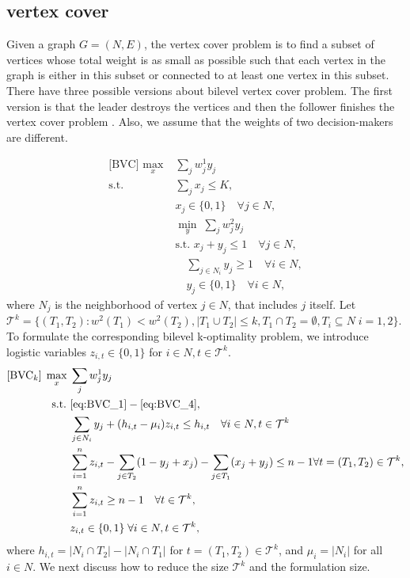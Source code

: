 \documentclass[11pt]{article}
\newcommand{\T}{\mathcal{T}}
\begin{document}
\subsection{vertex cover}
Given a graph $G = (N, E)$, the vertex cover problem is to find a subset of vertices whose total weight is as small as possible such that each vertex in the graph is either in this subset or connected to at least one vertex in this subset. There have three possible versions about bilevel vertex cover problem. The first version is that the leader destroys the vertices and then the follower finishes the vertex cover problem \cite{bazgan2011most}. Also, we assume that the weights of two decision-makers are different.

\begin{subequations}
	\begin{align}
	\text{[BVC]~}\max_x\; & \sum_j w_j^1 y_j \nonumber\\
	\text{s.t.~} & \sum_{j} x_j \leq K, \label{eq:BVC_1} \\
	& x_j \in \{0,1\} \quad \forall j\in N, \\
	& \min_y\;  \sum_j w_j^2 y_j \nonumber\\
	&\text{s.t.~}  x_j + y_j \leq 1 \quad \forall j\in N, \\
	& \quad \sum_{j\in N_i} y_j \geq 1 \quad \forall i\in N, \label{eq:BVC_3}\\
	& \quad y_j \in \{0, 1\} \quad \forall i \in N, \label{eq:BVC_4}
	\end{align}
\end{subequations}
where $N_j$ is the neighborhood of vertex $j\in N$, that includes $j$ itself. Let $\T^k = \{ (T_1, T_2): w^2(T_1) < w^2(T_2), |T_1\cup T_2|\leq k, T_1\cap T_2 = \emptyset, T_i \subseteq N\; i=1,2\}.$ To formulate the corresponding bilevel k-optimality problem, we introduce logistic variables $z_{i,t}\in \{0, 1\}$ for $i\in N, t\in \T^k$. 
\begin{subequations}
	\begin{align}
	[\text{BVC}_k]\;\max_x\; & \sum_j w_j^1 y_j \nonumber\\
	\text{s.t.~} & \eqref{eq:BVC_1} - \eqref{eq:BVC_4}, \nonumber\\
	& \sum_{j\in N_i} y_j + (h_{i, t} - \mu_i) z_{i, t} \leq h_{i, t} \quad \forall i\in N, t\in \T^k \\
	& \sum_{i=1}^n z_{i, t} - \sum_{j\in T_2} (1 - y_j + x_j) - \sum_{j\in T_1} (x_j + y_j) \leq n-1 \forall t = (T_1, T_2) \in \T^k, \label{eq:BVC_k_1}\\
	&  \sum_{i=1}^n z_{i, t} \geq n - 1 \quad \forall t\in \T^k, \label{eq:BVC_k_2}\\
	&  z_{i, t} \in \{0, 1\} \;\forall i\in N, t\in \T^k,
	\end{align}
\end{subequations}
where $h_{i, t} = |N_i \cap T_2| - |N_i \cap T_1|$ for $t = (T_1, T_2) \in \T^k$, and $\mu_i = |N_i|$ for all $i\in N$. We next discuss how to reduce the size $\T^k$ and the formulation  size.
\end{document}
